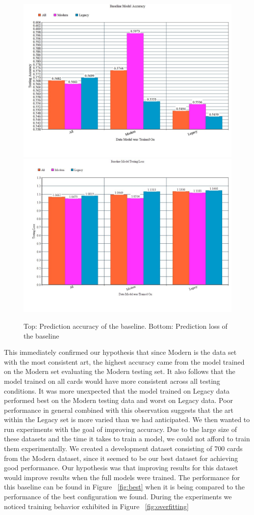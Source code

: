 \documentclass[letterpaper]{article} %
\begin{document}
\begin{figure}
  \includegraphics[width=.45\textwidth]{baseline-accuracy}
  \includegraphics[width=.45\textwidth]{baseline-loss}
  \caption{Top: Prediction accuracy of the baseline. Bottom: Prediction loss of the baseline}
  \label{fig:baseline}
\end{figure}

This immediately confirmed our hypothesis that since Modern is the data set
with the most consistent art, the highest accuracy came from the model trained
on the Modern set evaluating the Modern testing set.
It also follows that the model trained on all cards
would have more consistent across all testing conditions.
It was more unexpected that the model trained on Legacy
data performed best on the Modern testing data and worst on Legacy data.
Poor performance in general combined with this observation suggests that the art
within the Legacy set is more varied than we had anticipated.
We then wanted to run experiments with the goal of improving accuracy.
Due to the large size of these datasets and the time it takes to train a model,
we could not afford to train them experimentally.
We created a development dataset
consisting of 700 cards from the Modern dataset, since it seemed to be our best
dataset for achieving good performance.
Our hypothesis was that improving results
for this dataset would improve results when the full models were trained.
The performance for this baseline can be found in Figure ~\ref{fig:best}
when it is being compared
to the performance of the best configuration we found.
During the experiments we noticed training behavior exhibited in Figure ~\ref{fig:overfitting}
\end{document}
